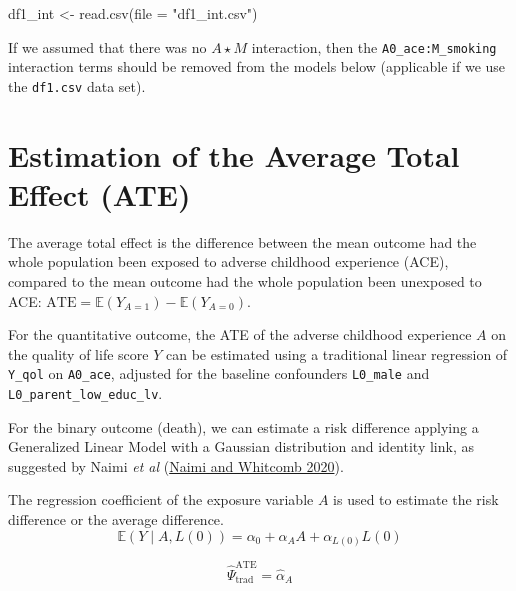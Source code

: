 \documentclass[
]{book}
\newenvironment{Shaded}{\begin{snugshade}}{\end{snugshade}}
\newcommand{\AttributeTok}[1]{\textcolor[rgb]{0.77,0.63,0.00}{#1}}
\newcommand{\FunctionTok}[1]{\textcolor[rgb]{0.00,0.00,0.00}{#1}}
\newcommand{\NormalTok}[1]{#1}
\newcommand{\OtherTok}[1]{\textcolor[rgb]{0.56,0.35,0.01}{#1}}
\newcommand{\StringTok}[1]{\textcolor[rgb]{0.31,0.60,0.02}{#1}}
\begin{document}
\begin{Shaded}
\begin{Highlighting}[]
\NormalTok{df1\_int }\OtherTok{\textless{}{-}} \FunctionTok{read.csv}\NormalTok{(}\AttributeTok{file =} \StringTok{"df1\_int.csv"}\NormalTok{)}
\end{Highlighting}
\end{Shaded}

If we assumed that there was no \(A \star M\) interaction, then the \texttt{A0\_ace:M\_smoking} interaction terms should be removed from the models below (applicable if we use the \texttt{df1.csv} data set).

\hypertarget{estimation-of-the-average-total-effect-ate}{%
\section{Estimation of the Average Total Effect (ATE)}\label{estimation-of-the-average-total-effect-ate}}

The average total effect is the difference between the mean outcome had the whole population been exposed to adverse childhood experience (ACE), compared to the mean outcome had the whole population been unexposed to ACE:
\(\text{ATE} = \mathbb{E}(Y_{A=1}) - \mathbb{E}(Y_{A=0})\).

For the quantitative outcome, the ATE of the adverse childhood experience \(A\) on the quality of life score \(Y\) can be estimated using a traditional linear regression of \texttt{Y\_qol} on \texttt{A0\_ace}, adjusted for the baseline confounders \texttt{L0\_male} and \texttt{L0\_parent\_low\_educ\_lv}.

For the binary outcome (death), we can estimate a risk difference applying a Generalized Linear Model with a Gaussian distribution and identity link, as suggested by Naimi \emph{et al} (\protect\hyperlink{ref-naimi2020}{Naimi and Whitcomb 2020}).

The regression coefficient of the exposure variable \(A\) is used to estimate the risk difference or the average difference.
\begin{equation} 
  \mathbb{E}(Y \mid A, L(0)) = \alpha_0 + \alpha_A A + \alpha_{L(0)} L(0) 
  \label{eq:regtotaleffect}
\end{equation}

\[ \hat{\Psi}_{\text{trad}}^{\text{ATE}} = \hat{\alpha}_A\]
\end{document}
